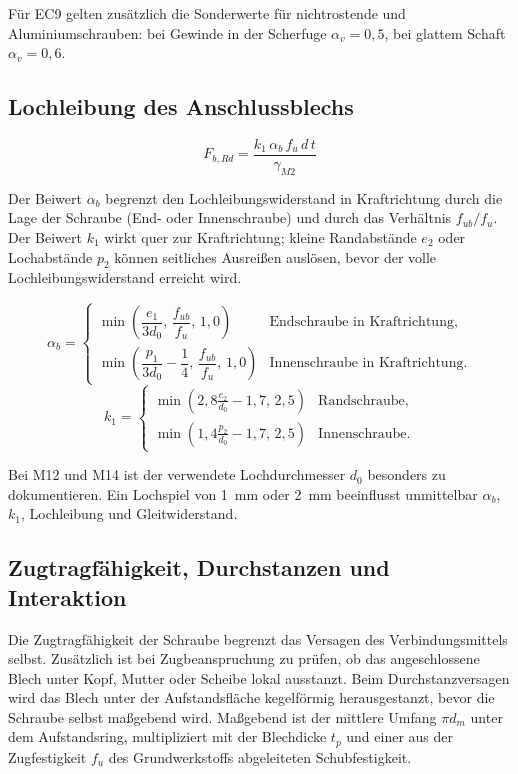 \documentclass[10pt,a4paper]{article}
\begin{document}
Für EC9 gelten zusätzlich die Sonderwerte für nichtrostende und Aluminiumschrauben: bei Gewinde in der Scherfuge $\alpha_v=0{,}5$, bei glattem Schaft $\alpha_v=0{,}6$.

\subsection{Lochleibung des Anschlussblechs}
\begin{equation}
F_{b,Rd}=\frac{k_1\,\alpha_b\, f_u\, d\, t}{\gamma_{M2}}
\end{equation}

Der Beiwert $\alpha_b$ begrenzt den Lochleibungswiderstand in Kraftrichtung durch die Lage der Schraube (End- oder Innenschraube) und durch das Verhältnis $f_{ub}/f_u$. Der Beiwert $k_1$ wirkt quer zur Kraftrichtung; kleine Randabstände $e_2$ oder Lochabstände $p_2$ können seitliches Ausreißen auslösen, bevor der volle Lochleibungswiderstand erreicht wird.

\begin{equation}
\alpha_b=\begin{cases}
\min\left(\dfrac{e_1}{3d_0},\,\dfrac{f_{ub}}{f_u},\,1{,}0\right) & \text{Endschraube in Kraftrichtung},\\[2mm]
\min\left(\dfrac{p_1}{3d_0}-\dfrac14,\,\dfrac{f_{ub}}{f_u},\,1{,}0\right) & \text{Innenschraube in Kraftrichtung}.
\end{cases}
\end{equation}
\begin{equation}
k_1=\begin{cases}
\min\left(2{,}8\frac{e_2}{d_0}-1{,}7,\,2{,}5\right) & \text{Randschraube},\\[1mm]
\min\left(1{,}4\frac{p_2}{d_0}-1{,}7,\,2{,}5\right) & \text{Innenschraube}.
\end{cases}
\end{equation}

\begin{hinweisbox}
Bei M12 und M14 ist der verwendete Lochdurchmesser $d_0$ besonders zu dokumentieren. Ein Lochspiel von \SI{1}{mm} oder \SI{2}{mm} beeinflusst unmittelbar $\alpha_b$, $k_1$, Lochleibung und Gleitwiderstand.
\end{hinweisbox}

\subsection{Zugtragfähigkeit, Durchstanzen und Interaktion}
Die Zugtragfähigkeit der Schraube begrenzt das Versagen des Verbindungsmittels selbst. Zusätzlich ist bei Zugbeanspruchung zu prüfen, ob das angeschlossene Blech unter Kopf, Mutter oder Scheibe lokal ausstanzt. Beim Durchstanzversagen wird das Blech unter der Aufstandsfläche kegelförmig herausgestanzt, bevor die Schraube selbst maßgebend wird. Maßgebend ist der mittlere Umfang $\pi d_m$ unter dem Aufstandsring, multipliziert mit der Blechdicke $t_p$ und einer aus der Zugfestigkeit $f_u$ des Grundwerkstoffs abgeleiteten Schubfestigkeit.
\end{document}
